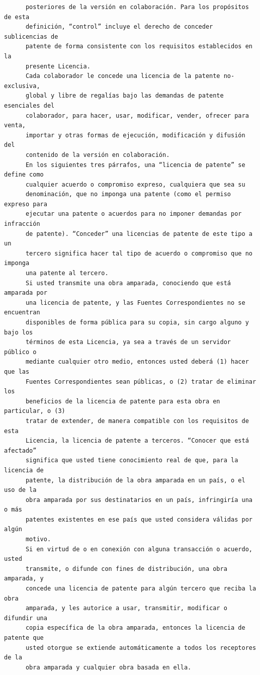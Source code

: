 \begin{verbatim}
      posteriores de la versión en colaboración. Para los propósitos de esta
      definición, “control” incluye el derecho de conceder sublicencias de
      patente de forma consistente con los requisitos establecidos en la
      presente Licencia.
      Cada colaborador le concede una licencia de la patente no-exclusiva,
      global y libre de regalías bajo las demandas de patente esenciales del
      colaborador, para hacer, usar, modificar, vender, ofrecer para venta,
      importar y otras formas de ejecución, modificación y difusión del
      contenido de la versión en colaboración.
      En los siguientes tres párrafos, una “licencia de patente” se define como
      cualquier acuerdo o compromiso expreso, cualquiera que sea su
      denominación, que no imponga una patente (como el permiso expreso para
      ejecutar una patente o acuerdos para no imponer demandas por infracción
      de patente). “Conceder” una licencias de patente de este tipo a un
      tercero significa hacer tal tipo de acuerdo o compromiso que no imponga
      una patente al tercero.
      Si usted transmite una obra amparada, conociendo que está amparada por
      una licencia de patente, y las Fuentes Correspondientes no se encuentran
      disponibles de forma pública para su copia, sin cargo alguno y bajo los
      términos de esta Licencia, ya sea a través de un servidor público o
      mediante cualquier otro medio, entonces usted deberá (1) hacer que las
      Fuentes Correspondientes sean públicas, o (2) tratar de eliminar los
      beneficios de la licencia de patente para esta obra en particular, o (3)
      tratar de extender, de manera compatible con los requisitos de esta
      Licencia, la licencia de patente a terceros. “Conocer que está afectado”
      significa que usted tiene conocimiento real de que, para la licencia de
      patente, la distribución de la obra amparada en un país, o el uso de la
      obra amparada por sus destinatarios en un país, infringiría una o más
      patentes existentes en ese país que usted considera válidas por algún
      motivo.
      Si en virtud de o en conexión con alguna transacción o acuerdo, usted
      transmite, o difunde con fines de distribución, una obra amparada, y
      concede una licencia de patente para algún tercero que reciba la obra
      amparada, y les autorice a usar, transmitir, modificar o difundir una
      copia específica de la obra amparada, entonces la licencia de patente que
      usted otorgue se extiende automáticamente a todos los receptores de la
      obra amparada y cualquier obra basada en ella.

\end{verbatim}
